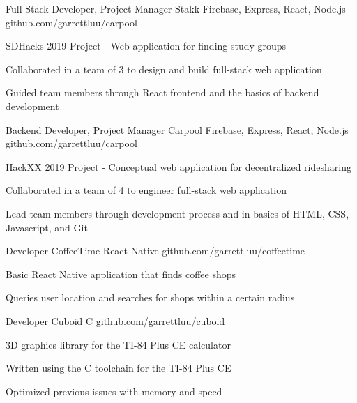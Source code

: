 \documentclass[]{awesome-cv}
\begin{document}
\vspace{-9mm}
\begin{cventries}

	\cventry
  {Full Stack Developer, Project Manager}
  {Stakk}
	{Firebase, Express, React, Node.js}
	{github.com/garrettluu/carpool}
  {\begin{cvitems}
    \item{SDHacks 2019 Project - Web application for finding study groups}
    \item{Collaborated in a team of 3 to design and build full-stack web application}
    \item{Guided team members through React frontend and the basics of backend development}
    \end{cvitems}}

	\vspace{-5mm}
  \cventry
  {Backend Developer, Project Manager}
  {Carpool}
	{Firebase, Express, React, Node.js}
	{github.com/garrettluu/carpool}
  {\begin{cvitems}
    \item{HackXX 2019 Project - Conceptual web application for decentralized ridesharing}
    \item{Collaborated in a team of 4 to engineer full-stack web application}
    \item{Lead team members through development process and in basics of HTML, CSS, Javascript, and Git}
    \end{cvitems}}

	\vspace{-5mm}
	\cventry
  {Developer}
  {CoffeeTime}
  {React Native}
	{github.com/garrettluu/coffeetime}
  {\begin{cvitems}
    \item{Basic React Native application that finds coffee shops}
    \item{Queries user location and searches for shops within a certain radius}
    \end{cvitems}}

	\vspace{-5mm}
	\cventry
  {Developer}
	{Cuboid}
	{C}
	{github.com/garrettluu/cuboid}
  {\begin{cvitems}
	  \item{3D graphics library for the TI-84 Plus CE calculator}
    \item{Written using the C toolchain for the TI-84 Plus CE}
    \item{Optimized previous issues with memory and speed}
    \end{cvitems}}

\end{cventries}
\end{document}
